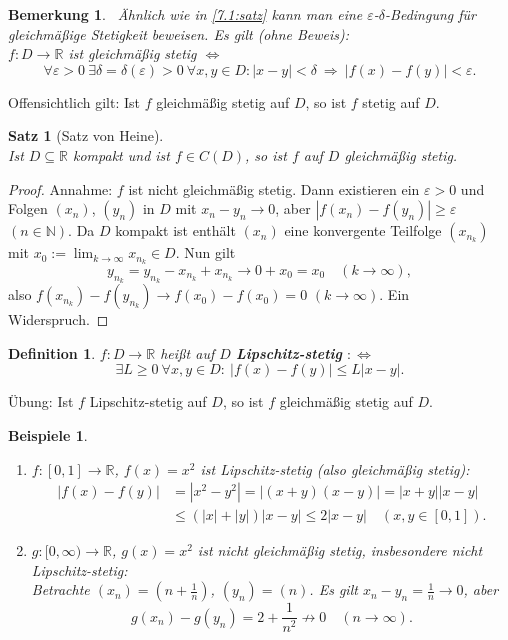 \documentclass[12pt]{extreport} %
\newcommand{\N}{\mathbb{N}}
\newcommand{\R}{\mathbb{R}}
\theoremstyle{named}
\theoremstyle{itshape}
\newtheorem{satz}[unnamedtheorem]{Satz}
\newtheorem*{definition}{Definition}
\theoremstyle{normal}
\newtheorem*{beispiele}{Beispiele}
\newtheorem*{bemerkung}{Bemerkung}
\begin{document}
{\begin{bemerkung} \
Ähnlich wie in \ref{7.1:satz} kann man eine $\varepsilon$-$\delta$-Bedingung für gleichmä{\ss}ige Stetigkeit beweisen. Es gilt (ohne Beweis): \\
$f \colon D \rightarrow \R$ ist gleichmä{\ss}ig stetig $\iff$ 
$$
\forall \varepsilon > 0 ~ \exists \delta=\delta(\varepsilon) > 0 ~ \forall x, y \in D: |x - y| < \delta ~ \Rightarrow ~ |f(x) - f(y)| < \varepsilon.
$$
\end{bemerkung}


Offensichtlich gilt: Ist $f$ gleichmä{\ss}ig stetig auf $D$, so ist $f$ stetig auf $D$.


\begin{satz}[Satz von Heine]  \label{7.16:satz} ~\\
	Ist $D \subseteq \R$ kompakt und ist $f \in C(D)$, so ist $f$ auf $D$ gleichmä{\ss}ig stetig.
\end{satz}

\begin{proof}
Annahme: $f$ ist nicht gleichmäßig stetig. Dann existieren ein $\varepsilon > 0$ und Folgen $(x_n)$, $(y_n)$ in $D$ mit $x_n-y_n \to 0$, aber $|f(x_n)-f(y_n)| \ge \varepsilon$ $(n \in \N)$.
Da $D$ kompakt ist enthält $(x_n)$ eine konvergente Teilfolge $(x_{n_k})$ mit $x_0:=\lim_{k \to \infty} x_{n_k} \in D$. Nun gilt 
$$
y_{n_k}= y_{n_k} - x_{n_k} +  x_{n_k} \to 0 + x_0 = x_0 \quad (k \to \infty),
$$
also $f(x_{n_k})-f(y_{n_k}) \to f(x_0)-f(x_0)=0$ $(k \to \infty)$. Ein Widerspruch.
\end{proof}


\begin{definition}
	$f \colon D \rightarrow \R$ hei{\ss}t auf $D$ \textbf{Lipschitz-stetig} $:\iff$ 
	$$ \exists L \geq 0 ~ \forall x, y \in D: ~  | f(x) - f(y) | \leq L |x - y|.  $$
\end{definition}

Übung: Ist $f$ Lipschitz-stetig auf $D$, so ist $f$ gleichmäßig stetig auf $D$.


\begin{beispiele} \
        \begin{enumerate}
        \item $f:[0, 1] \to \R$, $f(x) = x^{2}$ ist Lipschitz-stetig (also gleichmäßig stetig): 
	\begin{align*}
		|f(x) - f(y) | & = |x^{2} - y^{2}| = |(x + y) (x - y)| = |x+y| |x-y| \\
			& \leq (|x| + |y|) |x - y| \leq 2 |x - y| \quad (x, y \in [0, 1]).
	\end{align*}  
	\item $g \colon [0, \infty) \rightarrow \R$, $g(x) = x^{2}$ ist nicht gleichmäßig stetig, insbesondere nicht Lipschitz-stetig: \\
	Betrachte $(x_n)=(n+\frac{1}{n})$, $(y_n)=(n)$. Es gilt $x_n-y_n=\frac{1}{n} \to 0$, aber
	$$
	g(x_n)-g(y_n)=2+ \frac{1}{n^2} \not\to 0 \quad (n \to \infty).
	$$
	\end{enumerate}
\end{beispiele}




}
\end{document}
